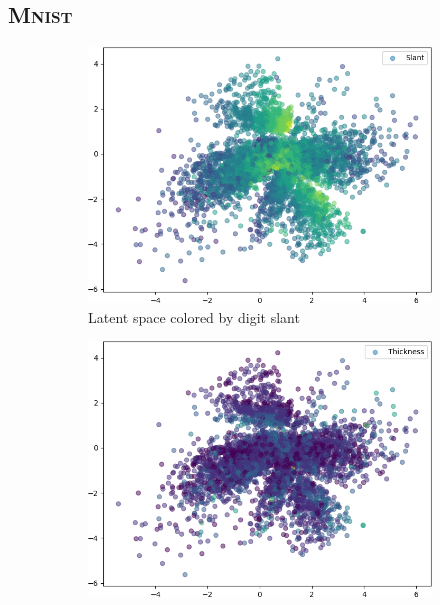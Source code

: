 \subsection{\textsc{Mnist}}
\begin{figure}[H]
    \centering
    \begin{subfigure}{.32\textwidth}
        \includegraphics[width=\textwidth]{images/latent_spaces/mnist/vae_gan/embeddings_mu_0.png}
        \caption{Latent space colored by digit slant}
        \label{subfig:vae_mnist_latent_space_slant}
    \end{subfigure}
    \hfill
    \begin{subfigure}{.32\textwidth}
        \includegraphics[width=\textwidth]{images/latent_spaces/mnist/vae_gan/embeddings_mu_1.png}

\end{subfigure}
\end{figure}
